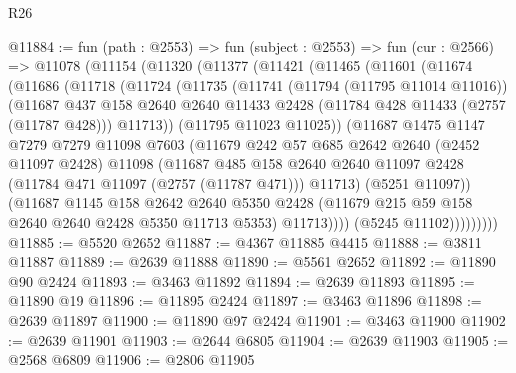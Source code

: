 \begin{lexlean}{R26}
\begin{coremodule}
@11884 := fun (path : @2553) =>
  fun (subject : @2553) =>
  fun (cur : @2566) =>
  @11078
    (@11154
      (@11320
        (@11377
          (@11421
            (@11465
              (@11601
                (@11674
                  (@11686
                    (@11718
                      (@11724
                        (@11735
                          (@11741
                            (@11794 (@11795 @11014 @11016))
                            (@11687
                              @437
                              @158
                              @2640
                              @2640
                              @11433
                              @2428
                              (@11784 @428 @11433 (@2757 (@11787 @428)))
                              @11713))
                          (@11795 @11023 @11025))
                        (@11687
                          @1475
                          @1147
                          @7279
                          @7279
                          @11098
                          @7603
                          (@11679
                            @242
                            @57
                            @685
                            @2642
                            @2640
                            (@2452 @11097 @2428)
                            @11098
                            (@11687
                              @485
                              @158
                              @2640
                              @2640
                              @11097
                              @2428
                              (@11784 @471 @11097 (@2757 (@11787 @471)))
                              @11713)
                            (@5251 @11097))
                          (@11687
                            @1145
                            @158
                            @2642
                            @2640
                            @5350
                            @2428
                            (@11679 @215 @59 @158 @2640 @2640 @2428 @5350 @11713 @5353)
                            @11713))))
                    (@5245 @11102)))))))))
@11885 := @5520 @2652
@11887 := @4367 @11885 @4415
@11888 := @3811 @11887
@11889 := @2639 @11888
@11890 := @5561 @2652
@11892 := @11890 @90 @2424
@11893 := @3463 @11892
@11894 := @2639 @11893
@11895 := @11890 @19
@11896 := @11895 @2424
@11897 := @3463 @11896
@11898 := @2639 @11897
@11900 := @11890 @97 @2424
@11901 := @3463 @11900
@11902 := @2639 @11901
@11903 := @2644 @6805
@11904 := @2639 @11903
@11905 := @2568 @6809
@11906 := @2806 @11905

\end{coremodule}
\end{lexlean}
